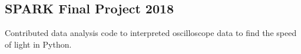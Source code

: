 \documentclass[../Resume.tex]{subfiles}
\begin{document}
	\subsection{SPARK Final Project \null\hfill 2018}
	\par Contributed data analysis code to interpreted oscilloscope data to find the speed of light in Python.
	\vspace*{-2mm}
\end{document}
